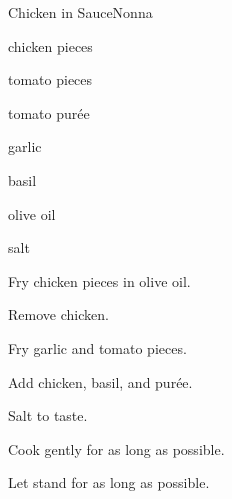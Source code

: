 \begin{recipe}{Chicken in Sauce}{Nonna}{}

\begin{ingredients}
\item chicken pieces
\item tomato pieces
\item tomato pur\'ee
\item garlic
\item basil
\item olive oil
\item salt
\end{ingredients}

\begin{directions}
\item Fry chicken pieces in olive oil.
\item Remove chicken.
\item Fry garlic and tomato pieces.
\item Add chicken, basil, and pur\'ee.
\item Salt to taste.
\item Cook gently for as long as possible.
\item Let stand for as long as possible.
\end{directions}

\end{recipe}
